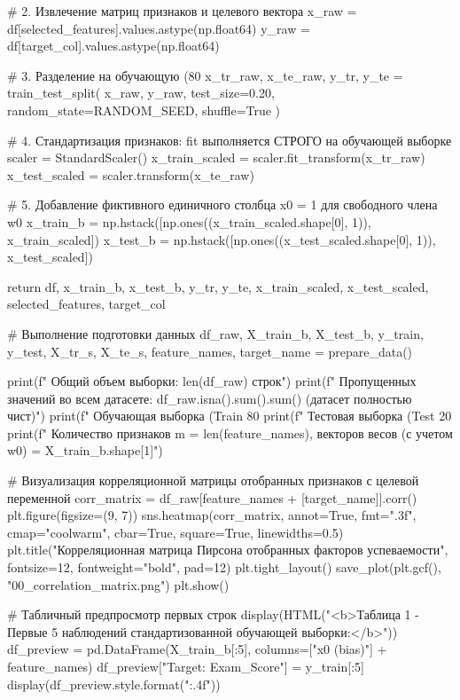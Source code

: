 \documentclass[14pt,a4paper]{extarticle}
\begin{document}
\begin{CodeListing}
    # 2. Извлечение матриц признаков и целевого вектора
    x_raw = df[selected_features].values.astype(np.float64)
    y_raw = df[target_col].values.astype(np.float64)

    # 3. Разделение на обучающую (80%
    x_tr_raw, x_te_raw, y_tr, y_te = train_test_split(
        x_raw, y_raw, test_size=0.20, random_state=RANDOM_SEED, shuffle=True
    )

    # 4. Стандартизация признаков: fit выполняется СТРОГО на обучающей выборке
    scaler = StandardScaler()
    x_train_scaled = scaler.fit_transform(x_tr_raw)
    x_test_scaled = scaler.transform(x_te_raw)

    # 5. Добавление фиктивного единичного столбца x0 = 1 для свободного члена w0
    x_train_b = np.hstack([np.ones((x_train_scaled.shape[0], 1)), x_train_scaled])
    x_test_b = np.hstack([np.ones((x_test_scaled.shape[0], 1)), x_test_scaled])

    return df, x_train_b, x_test_b, y_tr, y_te, x_train_scaled, x_test_scaled, selected_features, target_col


# Выполнение подготовки данных
df_raw, X_train_b, X_test_b, y_train, y_test, X_tr_s, X_te_s, feature_names, target_name = prepare_data()

print(f" Общий объем выборки: {len(df_raw)} строк")
print(f" Пропущенных значений во всем датасете: {df_raw.isna().sum().sum()} (датасет полностью чист)")
print(f" Обучающая выборка (Train 80%
print(f" Тестовая выборка   (Test 20%
print(f" Количество признаков m = {len(feature_names)}, векторов весов (с учетом w0) = {X_train_b.shape[1]}")

# Визуализация корреляционной матрицы отобранных признаков с целевой переменной
corr_matrix = df_raw[feature_names + [target_name]].corr()
plt.figure(figsize=(9, 7))
sns.heatmap(corr_matrix, annot=True, fmt=".3f", cmap="coolwarm", cbar=True, square=True, linewidths=0.5)
plt.title("Корреляционная матрица Пирсона отобранных факторов успеваемости", fontsize=12, fontweight="bold", pad=12)
plt.tight_layout()
save_plot(plt.gcf(), "00_correlation_matrix.png")
plt.show()

# Табличный предпросмотр первых строк
display(HTML("<b>Таблица 1 - Первые 5 наблюдений стандартизованной обучающей выборки:</b>"))
df_preview = pd.DataFrame(X_train_b[:5], columns=["x0 (bias)"] + feature_names)
df_preview["Target: Exam_Score"] = y_train[:5]
display(df_preview.style.format("{:.4f}"))


\end{CodeListing}
\end{document}
